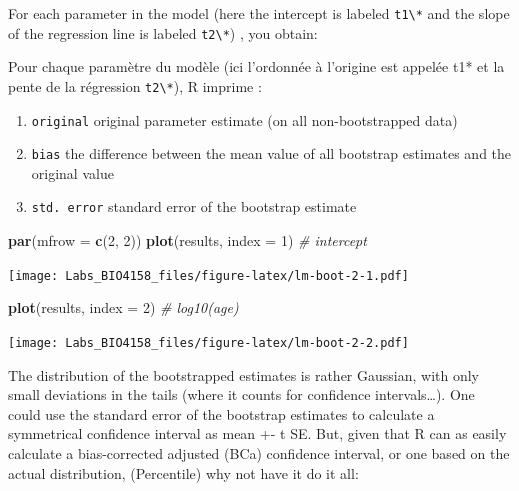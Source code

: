 \documentclass[
  12pt,
]{book}
\newenvironment{Shaded}{\begin{snugshade}}{\end{snugshade}}
\newcommand{\CommentTok}[1]{\textcolor[rgb]{0.56,0.35,0.01}{\textit{#1}}}
\newcommand{\DataTypeTok}[1]{\textcolor[rgb]{0.13,0.29,0.53}{#1}}
\newcommand{\DecValTok}[1]{\textcolor[rgb]{0.00,0.00,0.81}{#1}}
\newcommand{\KeywordTok}[1]{\textcolor[rgb]{0.13,0.29,0.53}{\textbf{#1}}}
\newcommand{\NormalTok}[1]{#1}
\providecommand{\tightlist}{%
  \setlength{\itemsep}{0pt}\setlength{\parskip}{0pt}}
\begin{document}
For each parameter in the model (here the intercept is labeled \texttt{t1\textbackslash{}*} and the slope of the regression line is labeled \texttt{t2\textbackslash{}*}) , you obtain:

Pour chaque paramètre du modèle (ici l'ordonnée à l'origine est
appelée t1* et la pente de la régression \texttt{t2\textbackslash{}*}), R imprime :

\begin{enumerate}
\def\labelenumi{\arabic{enumi}.}
\tightlist
\item
  \texttt{original} original parameter estimate (on all non-bootstrapped data)
\item
  \texttt{bias} the difference between the mean value of all bootstrap estimates and the original value
\item
  \texttt{std.\ error} standard error of the bootstrap estimate
\end{enumerate}

\begin{Shaded}
\begin{Highlighting}[]
\KeywordTok{par}\NormalTok{(}\DataTypeTok{mfrow =} \KeywordTok{c}\NormalTok{(}\DecValTok{2}\NormalTok{, }\DecValTok{2}\NormalTok{))}
\KeywordTok{plot}\NormalTok{(results, }\DataTypeTok{index =} \DecValTok{1}\NormalTok{) }\CommentTok{\# intercept}
\end{Highlighting}
\end{Shaded}

\texttt{[image: Labs\_BIO4158\_files/figure-latex/lm-boot-2-1.pdf]}

\begin{Shaded}
\begin{Highlighting}[]
\KeywordTok{plot}\NormalTok{(results, }\DataTypeTok{index =} \DecValTok{2}\NormalTok{) }\CommentTok{\# log10(age)}
\end{Highlighting}
\end{Shaded}

\texttt{[image: Labs\_BIO4158\_files/figure-latex/lm-boot-2-2.pdf]}

The distribution of the bootstrapped estimates is rather Gaussian, with only small deviations in the tails (where it counts for confidence intervals\ldots). One could use the standard error of the bootstrap estimates to calculate a symmetrical confidence interval as mean +- t SE. But, given that R can as easily calculate a bias-corrected adjusted (BCa) confidence interval, or one based on the actual distribution, (Percentile) why not have it do it all:
\end{document}
